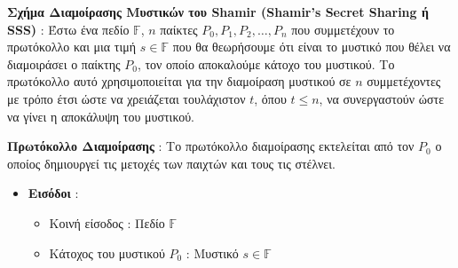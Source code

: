 \begin{definition}
\textbf{Σχήμα Διαμοίρασης Μυστικών του Shamir (Shamir's Secret Sharing ή SSS)} : Έστω ένα πεδίο $\mathbb{F}$, $n$ παίκτες $P_0, P_1, P_2, \ldots, P_n$ που συμμετέχουν το πρωτόκολλο και μια τιμή $s \in \mathbb{F}$ που θα θεωρήσουμε ότι είναι το μυστικό που θέλει να διαμοιράσει ο παίκτης $P_0$, τον οποίο αποκαλούμε κάτοχο του μυστικού. Το πρωτόκολλο αυτό χρησιμοποιείται για την διαμοίραση  μυστικού σε $n$ συμμετέχοντες με τρόπο έτσι ώστε να χρειάζεται τουλάχιστον $t$, όπου $t \le n$, να συνεργαστούν ώστε να γίνει η αποκάλυψη του μυστικού.

\begin{mdframed}
    \textbf{Πρωτόκολλο Διαμοίρασης} : Το πρωτόκολλο διαμοίρασης εκτελείται από τον $P_0$ ο οποίος δημιουργεί τις μετοχές των παιχτών και τους τις στέλνει.
    \begin{itemize}
        \item \textbf{Εισόδοι} :
            \begin{itemize}
                \item Κοινή είσοδος : Πεδίο $\mathbb{F}$
                \item Κάτοχος του μυστικού $P_0$ : Μυστικό $s \in \mathbb{F}$
            \end{itemize}
        

\end{itemize}
\end{mdframed}
\end{definition}
